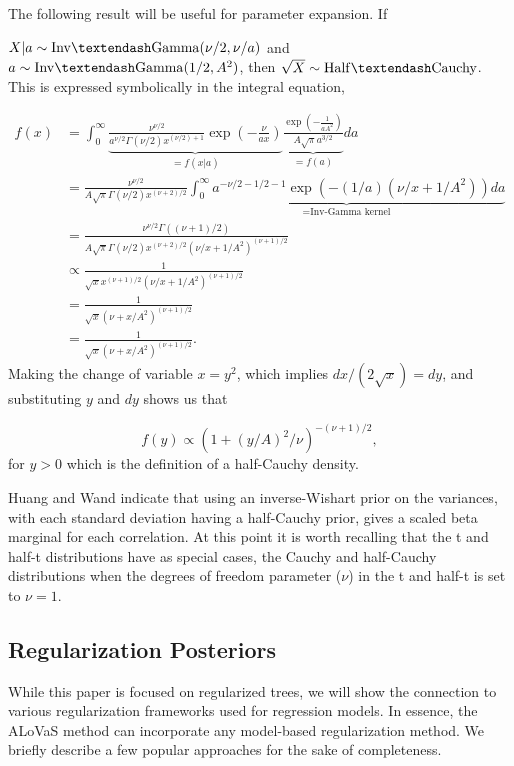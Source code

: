 The following result will be useful for parameter expansion. If 

$X\vert a \sim \mathrm{Inv\textendash Gamma}(\nu/2, \nu/a)$ and  $a \sim \mathrm{Inv\textendash Gamma}(1/2,A^2)$, then $\sqrt{X}\sim \mathrm{Half\textendash Cauchy}$. This is expressed symbolically in the integral equation,

\begin{align*}
f(x) &= \int_0^\infty \underbrace{  \frac{\nu^{\nu/2}}{a^{\nu/2}\Gamma(\nu/2)x^{(\nu/2)+1}}\exp{(-\frac{\nu}{ax})}   }_{=f(x\vert a)} \underbrace{\frac{\exp{(-\frac{1}{aA^2})}}{A\sqrt{\pi}a^{3/2}}}_{=f(a)} da\\
&=\frac{\nu^{\nu/2}}{A\sqrt{\pi}\Gamma(\nu/2)x^{(\nu+2)/2}}\underbrace{\int_0^\infty a^{-\nu/2-1/2-1}\exp{(-(1/a)(\nu/x+1/A^2))}da}_{=\text{Inv-Gamma kernel}}\\
&=\frac{\nu^{\nu/2}\Gamma((\nu+1)/2)}{A\sqrt{\pi}\Gamma(\nu/2)x^{(\nu+2)/2}(\nu/x+1/A^2)^{(\nu+1)/2}}\\
&\propto \frac{1}{\sqrt{x}x^{(\nu+1)/2}(\nu/x+1/A^2)^{(\nu+1)/2}}\\
& =\frac{1}{\sqrt{x}(\nu+x/A^2)^{(\nu+1)/2}  }\\
&=\frac{1}{\sqrt{x}(\nu+x/A^2)^{(\nu+1)/2}  }.
\end{align*}
Making the change of variable $x=y^2$, which implies $dx/(2\sqrt{x})=dy$, and substituting $y$ and $dy$ shows us that 

\begin{equation}
f(y) \propto (1+(y/A)^2/\nu)^{-(\nu+1)/2},
\end{equation}
for $y>0$ which is the definition of a half-Cauchy density. 

Huang and Wand \cite{huang2013simple} indicate that using an inverse-Wishart prior on the variances, with each standard deviation having a half-Cauchy prior, gives a scaled beta marginal for each correlation. At this point it is worth recalling that the t and half-t distributions have as special cases, the Cauchy and half-Cauchy distributions when the degrees of freedom parameter ($\nu$) in the t and half-t is set to $\nu=1$. 


\subsection{Regularization Posteriors}\label{subsec:Regularization Priors}
		While this paper is focused on regularized trees, we will show the connection to various regularization frameworks used for regression models. In essence, the ALoVaS method can incorporate any model-based regularization method. We briefly describe a few popular approaches for the sake of completeness. 
		
